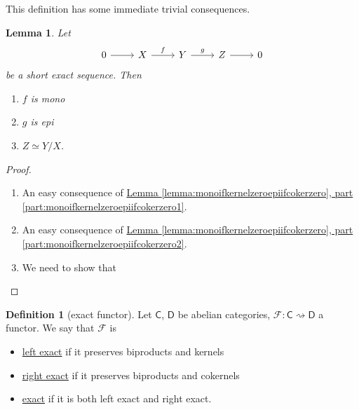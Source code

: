 \documentclass[a4paper,10pt]{scrreprt}
\newcommand{\defn}[1]{\ul{#1}}
\theoremstyle{definition}
\newtheorem{definition}{Definition}[section]
\theoremstyle{plain}
\newtheorem{lemma}{Lemma}[section]
\theoremstyle{remark}
\begin{document}
This definition has some immediate trivial consequences.
\begin{lemma}
  Let 
  \begin{equation*}
    \begin{tikzcd}
      0
      \arrow[r]
      & X
      \arrow[r, "f"]
      & Y
      \arrow[r, "g"]
      & Z
      \arrow[r]
      & 0
    \end{tikzcd}
  \end{equation*}
  be a short exact sequence. Then
  \begin{enumerate}
    \item $f$ is mono
    \item $g$ is epi
    \item $Z \simeq Y/X$.
  \end{enumerate}
\end{lemma}
\begin{proof}
  $\,$
  \begin{enumerate}
    \item An easy consequence of \hyperref[lemma:monoifkernelzeroepiifcokerzero]{Lemma \ref*{lemma:monoifkernelzeroepiifcokerzero}, part \ref*{part:monoifkernelzeroepiifcokerzero1}}.
    \item An easy consequence of \hyperref[lemma:monoifkernelzeroepiifcokerzero]{Lemma \ref*{lemma:monoifkernelzeroepiifcokerzero}, part \ref*{part:monoifkernelzeroepiifcokerzero2}}.
    \item We need to show that
  \end{enumerate}
\end{proof}

\begin{definition}[exact functor]
  \label{def:exactfunctor}
  Let $\mathsf{C}$, $\mathsf{D}$ be abelian categories, $\mathcal{F}\colon \mathsf{C} \rightsquigarrow \mathsf{D}$ a functor. We say that $\mathcal{F}$ is
  \begin{itemize}
    \item \defn{left exact} if it preserves biproducts and kernels
    \item \defn{right exact} if it preserves biproducts and cokernels
    \item \defn{exact} if it is both left exact and right exact.
  \end{itemize}
\end{definition}
\end{document}
